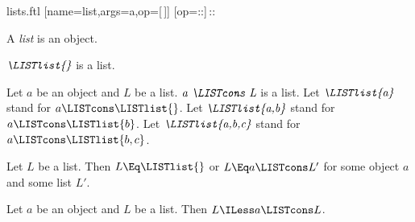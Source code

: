 \documentclass{stex}
\begin{document}
\begin{smodule}{lists.ftl}
[name=list,args=a,op=[\,]]{}
[op=::]{\,{::}\,}

\begin{signature}[forthel,for=LISTlist]
  A \emph{list} is an object.
\end{signature}

\begin{signature}[forthel,for=LISTlist]
  $\emph{\LISTlist{}}$ is a list.
\end{signature}

\begin{signature}[forthel,for=LISTlist]
  Let $a$ be an object and $L$ be a list.
  $\emph{a \LISTcons L}$ is a list.
  Let $\emph{\LISTlist{a}}$ stand for $a \LISTcons \LISTlist{}$.
  Let $\emph{\LISTlist{a,b}}$ stand for $a \LISTcons \LISTlist{b}$.
  Let $\emph{\LISTlist{a,b,c}}$ stand for $a \LISTcons \LISTlist{b,c}$.
\end{signature}

\begin{axiom}[forthel,for=LISTlist]
  Let $L$ be a list.
  Then $L \Eq \LISTlist{}$ or $L \Eq a \LISTcons L'$ for some object $a$ and some list $L'$.
\end{axiom}

\begin{axiom}[forthel,for=LISTlist]
  Let $a$ be an object and $L$ be a list.
  Then $L \ILess a \LISTcons L$.
\end{axiom}
\end{smodule}
\end{document}
